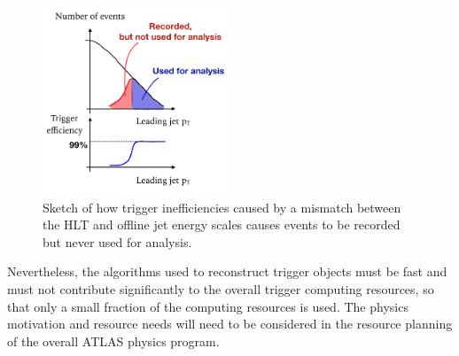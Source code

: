 

\begin{figure} 
\begin{center}
\includegraphics[width=0.5\textwidth]{figures/efficiencySketch}
\caption{\color{black}\label{fig:wastedRate} \small Sketch of how trigger inefficiencies caused by a mismatch between the HLT and offline jet energy scales causes events to be recorded but never used for analysis.} %
\end{center}
\end{figure}

Nevertheless, the algorithms used to reconstruct trigger objects must be fast and must not contribute significantly to the overall trigger computing resources, so that only a small fraction of the computing resources is used.
The physics motivation and resource needs will need to be considered in the resource planning of the overall ATLAS physics program.










